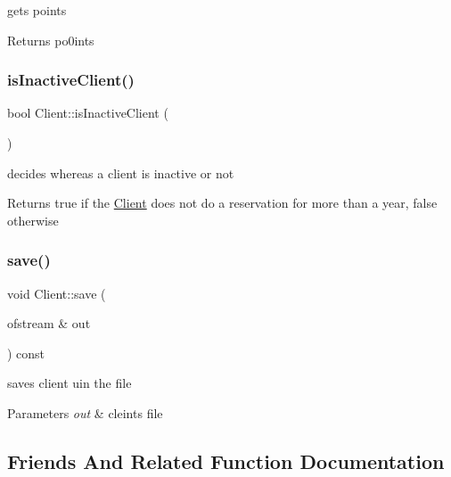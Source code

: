gets points 

\begin{DoxyReturn}{Returns}
po0ints 
\end{DoxyReturn}
\hypertarget{class_client_ad86cb579332bc44345392cdc97787845}{}\label{class_client_ad86cb579332bc44345392cdc97787845} 
\subsubsection{\texorpdfstring{is\+Inactive\+Client()}{isInactiveClient()}}
{\footnotesize\ttfamily bool Client\+::is\+Inactive\+Client (\begin{DoxyParamCaption}{ }\end{DoxyParamCaption})}



decides whereas a client is inactive or not 

\begin{DoxyReturn}{Returns}
true if the \hyperlink{class_client}{Client} does not do a reservation for more than a year, false otherwise 
\end{DoxyReturn}
\hypertarget{class_client_a2a03ca4558efd182ea5d76dfcec24ecb}{}\label{class_client_a2a03ca4558efd182ea5d76dfcec24ecb} 
\subsubsection{\texorpdfstring{save()}{save()}}
{\footnotesize\ttfamily void Client\+::save (\begin{DoxyParamCaption}\item[{ofstream \&}]{out }\end{DoxyParamCaption}) const}



saves client uin the file 


\begin{DoxyParams}{Parameters}
{\em out} & cleints file \\
\hline
\end{DoxyParams}


\subsection{Friends And Related Function Documentation}
\hypertarget{class_client_aea51b89449361cfdb924f76a4f9bc590}{}\label{class_client_aea51b89449361cfdb924f76a4f9bc590} 
